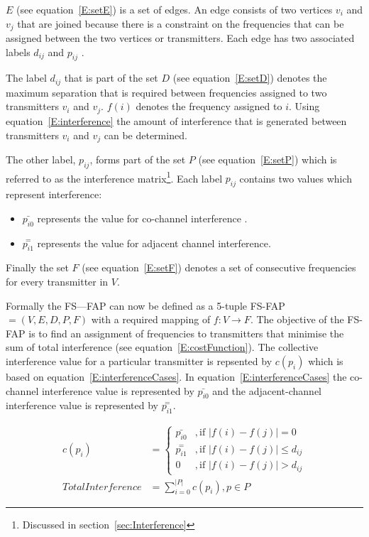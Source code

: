 $E$ (see equation~\ref{E:setE}) is a set of edges\cite{MontemanniThesis}. An edge consists of two vertices $v_i$ and $v_j$ that are joined because there is a constraint on the frequencies that can be assigned between the two vertices or transmitter\cite{MontemanniThesis}s. Each edge has two associated labels $d_{ij}$ and $p_{ij}$ \cite{FAPOrientationModel,TabuMontemanniSmith}. 

The label $d_{ij}$ that is part of the set $D$ (see equation~\ref{E:setD}) denotes the maximum separation that is required between frequencies assigned to two transmitters $v_i$ and $v_j$. $f(i)$ denotes the frequency assigned to $i$. Using equation~\ref{E:interference} the amount of interference that is generated between transmitters $v_i$ and $v_j$ can be determined\cite{FAPOrientationModel,TabuMontemanniSmith}.

The other label, $p_{ij}$, forms part of the set $P$ (see equation~\ref{E:setP}) which is referred to as the interference matrix\footnote{Discussed in section~\ref{sec:Interference}}\cite{Eisenblatter}. Each label $p_{ij}$ contains two values which represent interference:
\begin{itemize}
\item $\bar{p_{i0}}$ represents the value for co-channel interference \cite{FAPOrientationModel,TabuMontemanniSmith}. 
\item $\overset{=}{p_{i1}}$ represents the value for adjacent channel interference\cite{FAPOrientationModel,TabuMontemanniSmith}.
\end{itemize}

Finally the set $F$ (see equation~\ref{E:setF}) denotes a set of consecutive frequencies for every transmitter in $V$\cite{FAPOrientationModel,TabuMontemanniSmith}.

Formally the FS---FAP can now be defined as a 5-tuple \gls{FS-FAP} $= (V,E,D,P,F)$ with a required mapping of $f: V \rightarrow F$\cite{TabuMontemanniSmith}. The objective of the FS-FAP is to find an assignment of frequencies to transmitters that minimise the sum of total interference (see equation~\ref{E:costFunction}). The collective interference value for a particular transmitter is repsented by $c(p_i)$ which is based on equation~\ref{E:interferenceCases}. In equation~\ref{E:interferenceCases} the co-channel interference value is represented by $\bar{p_{i0}}$ and the adjacent-channel interference value is represented by $\overset{=}{p_{i1}}$.

\begin{align} 
 \label{E:interferenceCases}
 c(p_i) &= 
 \begin{cases}
	\bar{p_{i0}} &,\text{if $|f(i) - f(j)| = 0$}\\
	\overset{=}{p_{i1}} &, \text{if $|f(i) - f(j)| \leqslant d_{ij}$}\\
	0 &,\text{if $|f(i) - f(j)| > d_{ij}$}
 \end{cases}\\
 \label{E:costFunction}
 Total Interference &= \sum^{|P|}_{i = 0}c(p_i),p \in P 
\end{align}

